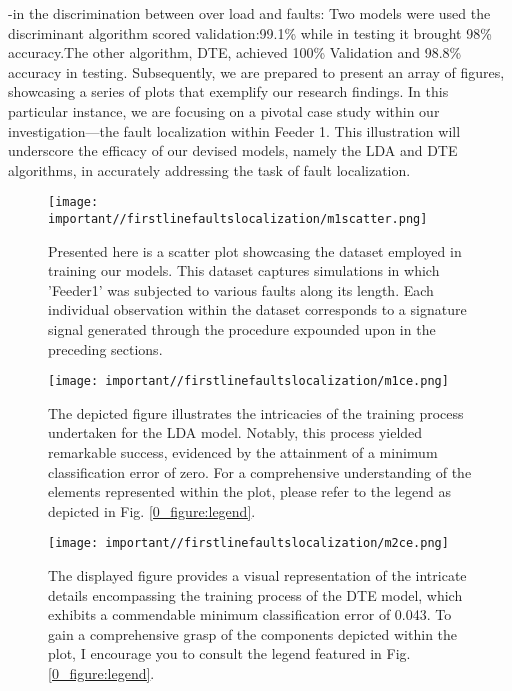 \documentclass[8pt,a4paper,oneside]{elsarticle}
\begin{document}
-in the discrimination between over load and faults: 
Two models were used the discriminant algorithm scored validation:99.1\% while in testing it brought 98\% accuracy.The other algorithm, DTE, achieved 100\% Validation and 98.8\% accuracy in testing.
Subsequently, we are prepared to present an array of figures, showcasing a series of plots that exemplify our research findings. In this particular instance, we are focusing on a pivotal case study within our investigation—the fault localization within Feeder 1. This illustration will underscore the efficacy of our devised models, namely the LDA and DTE algorithms, in accurately addressing the task of fault localization.
\begin{figure}[H]
    \centering
    \texttt{[image: important//firstlinefaultslocalization/m1scatter.png]}
    \caption{Presented here is a scatter plot showcasing the dataset employed in training our models. This dataset captures simulations in which 'Feeder1' was subjected to various faults along its length. Each individual observation within the dataset corresponds to a signature signal generated through the procedure expounded upon in the preceding sections.}
    \label{0_fig:15_scatterPlotModel 1}
\end{figure}
\begin{figure}[H]
    \centering
    \texttt{[image: important//firstlinefaultslocalization/m1ce.png]}
    \caption{The depicted figure illustrates the intricacies of the training process undertaken for the LDA model. Notably, this process yielded remarkable success, evidenced by the attainment of a minimum classification error of zero. For a comprehensive understanding of the elements represented within the plot, please refer to the legend as depicted in Fig. \ref{0_figure:legend}. }
    \label{0_figure:mode_l_1miniClassificationError}
\end{figure}
\begin{figure}[H]
    \centering
    \texttt{[image: important//firstlinefaultslocalization/m2ce.png]}
    \caption{The displayed figure provides a visual representation of the intricate details encompassing the training process of the DTE model, which exhibits a commendable minimum classification error of 0.043. To gain a comprehensive grasp of the components depicted within the plot, I encourage you to consult the legend featured in Fig. \ref{0_figure:legend}.}
    \label{0_figure:mode_2_1miniClassificationError}
\end{figure}
\end{document}
